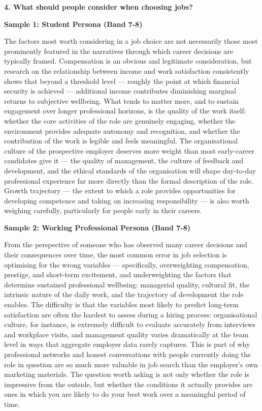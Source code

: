 \separator

\begin{ieltsquestion}
\textbf{4. What should people consider when choosing jobs?}
\end{ieltsquestion}
\textbf{Sample 1: Student Persona (Band 7-8)}

The factors most worth considering in a job choice are not necessarily those most prominently featured in the narratives through which career decisions are typically framed. Compensation is an obvious and legitimate consideration, but research on the relationship between income and work satisfaction consistently shows that beyond a threshold level — roughly the point at which financial security is achieved — additional income contributes diminishing marginal returns to subjective wellbeing. What tends to matter more, and to sustain engagement over longer professional horizons, is the quality of the work itself: whether the core activities of the role are genuinely engaging, whether the environment provides adequate autonomy and recognition, and whether the contribution of the work is legible and feels meaningful. The organisational culture of the prospective employer deserves more weight than most early-career candidates give it — the quality of management, the culture of feedback and development, and the ethical standards of the organisation will shape day-to-day professional experience far more directly than the formal description of the role. Growth trajectory — the extent to which a role provides opportunities for developing competence and taking on increasing responsibility — is also worth weighing carefully, particularly for people early in their careers.

\textbf{Sample 2: Working Professional Persona (Band 7-8)}

From the perspective of someone who has observed many career decisions and their consequences over time, the most common error in job selection is optimising for the wrong variables — specifically, overweighting compensation, prestige, and short-term excitement, and underweighting the factors that determine sustained professional wellbeing: managerial quality, cultural fit, the intrinsic nature of the daily work, and the trajectory of development the role enables. The difficulty is that the variables most likely to predict long-term satisfaction are often the hardest to assess during a hiring process: organisational culture, for instance, is extremely difficult to evaluate accurately from interviews and workplace visits, and management quality varies dramatically at the team level in ways that aggregate employer data rarely captures. This is part of why professional networks and honest conversations with people currently doing the role in question are so much more valuable in job search than the employer's own marketing materials. The question worth asking is not only whether the role is impressive from the outside, but whether the conditions it actually provides are ones in which you are likely to do your best work over a meaningful period of time.

